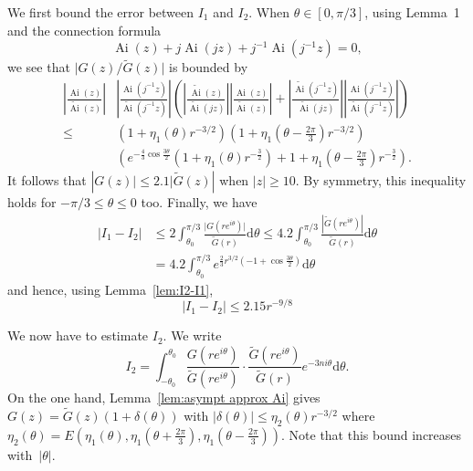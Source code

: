 \documentclass[10pt, conference]{IEEEtran}
\DeclareMathOperator{\Ai}{Ai}
\newcommand{\abs}[1]{\mathopen|#1\mathclose|}
\newcommand{\mathd}{\mathrm{d}}
\begin{document}
\begin{IEEEproof}
  We first bound the error between $I_1$ and $I_2$. When $\theta \in [0,\pi / 3]$,
  using Lemma~1 and the connection formula~{\cite[Eq. 9.2.12]{DLMF}}
  \[ \Ai(z) + j \Ai(jz) + j^{- 1}
     \Ai(j^{- 1} z) = 0, \]
  we see that {$\abs{G(z) / \tilde{G}(z)}$} is
  bounded by
  \begin{align*}
    \left|\tfrac{\Ai(z)}{\widetilde{\Ai}(z)}\right| &
    \left|\tfrac{\Ai(j^{-1}z)}{\widetilde{\Ai}(j^{-1}z)}\right|
    \left(
        \left|\tfrac{\widetilde{\Ai}(z)}{\widetilde{\Ai}(jz)}\right|
        \left|\tfrac{\Ai(z)}{\widetilde{\Ai}(z)}\right|
+
    \left|\tfrac{\widetilde{\Ai}(j^{-1}z)}{\widetilde{\Ai}(jz)}\right|
    \left|\tfrac{\Ai(j^{-1}z)}{\widetilde{\Ai}(j^{-1}z)}\right|\right)\\
    \leq&
    (1+{\eta}_1({\theta})r^{-3/2})
    (1+{\eta}_1({\theta}-{\tfrac{2{\pi}}{3}})r^{-3/2})\\
    &
    \left(e^{-{\frac{4}{3}}\cos{\frac{3{\theta}}{2}}}(1+{\eta}_1({\theta})r^{-{\frac{3}{2}}})+1+{\eta}_1({\theta}-{\tfrac{2{\pi}}{3}})r^{-{\frac{3}{2}}}\right).
  \end{align*}
  It follows that $\abs{G(z)} \leq 2.1 | \tilde{G}(z) |$ when $\abs{z} \geq 10$.
  By symmetry, this inequality holds for $- \pi / 3 \leq \theta
  \leq 0$ too.
Finally, we have
  \begin{align*}
    \left|I_1-I_2\right|
    &\leq 2\int_{{\theta}_0}^{{\pi}/3}{\frac{\abs{G(re^{i{\theta}})}}{\tilde{G}(r)}}{\mathd}{\theta}
    \leq 4.2\int_{{\theta}_0}^{{\pi}/3}{\frac{|\tilde{G}(re^{i{\theta}})|}{\tilde{G}(r)}}{\mathd}{\theta} \\
    &= 4.2\int_{{\theta}_0}^{{\pi}/3}e^{{\frac{2}{3}}r^{3/2}(-1+\cos {\frac{3{\theta}}{2}})}{\mathd}{\theta}
  \end{align*}
  and hence, using Lemma~\ref{lem:I2-I1},
  \begin{equation}
    \abs{I_1 - I_2} \leq 2.15 r^{- 9 / 8} \label{eq:bound B}
  \end{equation}

  We now have to estimate $I_2$. We write
  \[
  I_2 = \int_{-\theta_0}^{{\theta}_0} \frac{G(re^{i{\theta}})}{\tilde{G}(re^{i\theta})} \cdot \frac{\tilde{G}(re^{i{\theta}})}{\tilde{G}(r)} e^{-3ni{\theta}}{\mathd}{\theta}.
  \]
  On the one hand, Lemma~\ref{lem:asympt approx Ai} gives
  $  G(z) = \tilde{G}(z)(1+\delta(\theta))$ with
  $ |\delta(\theta)| \le \eta_2(\theta)r^{-3/2}$ where $\eta_2(\theta) = E(\eta_1(\theta),
  \eta_1(\theta + \frac{2 \pi}{3}), \eta_1(\theta - \frac{2 \pi}{3}))$.
  Note that this bound increases with~$\abs{\theta}$.


\end{IEEEproof}
\end{document}
